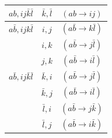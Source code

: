 \documentclass[./thesis.tex]{subfiles}
\begin{document}
\begin{table}
\begin{tabular}{ c|c|c }
		\hline
		\rule{0pt}{3ex} $ab,ij\bar k \bar l$                                                                               & $\bar k, \bar l$                                                                             & $(ab \rightarrow ij)$                                           \\
		                   
		\hline
		\rule{0pt}{3ex} $a\bar b,ijk \bar l$                                                                               & $i,j$                                                                                        & $(a \bar b\rightarrow k  \bar l)$                               \\
		                                                                                                   & $i,k$                                                                                        & $(a \bar b\rightarrow j  \bar l)$                               \\
		                                                                                                   & $j,k$                                                                                        & $(a \bar b\rightarrow i  \bar l)$                               \\
		                              
		\hline
		\rule{0pt}{3ex} $a\bar b,ij \bar k \bar l$                                                                         & $\bar k,i$                                                                                   & $(a \bar b \rightarrow j \bar l)$                               \\
		                                                                                                   & $\bar k,j$                                                                                   & $(a \bar b \rightarrow i \bar l)$                               \\
		                                                                                                   & $\bar l,i$                                                                                   & $(a \bar b \rightarrow j \bar k)$                               \\
		                                                                                                   & $\bar l,j$                                                                                   & $(a \bar b \rightarrow i \bar k)$                               \\
	\end{tabular} 
\end{table}
\end{document}
